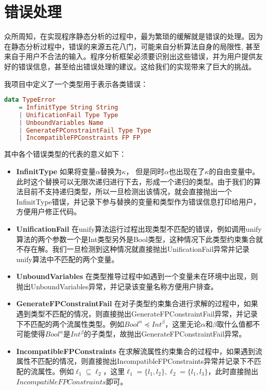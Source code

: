 \documentclass[UTF8, colorlinks]{pkuthss}
\begin{document}
	\section{错误处理}
	众所周知，在实现程序静态分析的过程中，最为繁琐的缓解就是错误的处理。因为在静态分析过程中，错误的来源五花八门，可能来自分析算法自身的局限性, 甚至来自于用户不合法的输入。程序分析框架必须要识别出这些错误，并为用户提供友好的错误信息，甚至给出错误处理的建议。这给我们的实现带来了巨大的挑战。
	
	我项目中定义了一个类型用于表示各类错误：
	\begin{lstlisting}[language=haskell]
data TypeError 
    = InfinitType String String
    | UnificationFail Type Type
    | UnboundVariables Name
    | GenerateFPConstraintFail Type Type
    | IncompatibleFPConstraints FP FP
	\end{lstlisting}
	其中各个错误类型的代表的意义如下：
	\begin{itemize}
		\item \textbf{InfinitType} 如果将变量$\alpha$替换为$\kappa$， 但是同时$\alpha$也出现在了$\kappa$的自由变量中。此时这个替换可以无限次递归进行下去，形成一个递归的类型。由于我们的算法目前不支持递归类型，所以一旦检测出该情况，就会直接抛出一个InfinitType错误，并记录下参与替换的变量和类型作为错误信息打印给用户，方便用户修正代码。
		\item \textbf{UnificationFail} 在unify算法运行过程出现类型不匹配的错误，例如调用unify算法的两个参数一个是Int类型另外是Bool类型，这种情况下此类型约束集合就不存在解。我们一旦检测到这种情况就直接抛出UnificationFail异常并记录unify算法中不匹配的两个变量。
		\item \textbf{UnboundVariables} 在类型推导过程中如遇到一个变量未在环境中出现，则抛出UnboundVariables异常，并记录该变量名称方便用户排查。
		\item \textbf{GenerateFPConstraintFail}  在对子类型约束集合进行求解的过程中，如果遇到类型不匹配的情况，则直接抛出GenerateFPConstraintFail异常，并记录下不匹配的两个流属性类型。例如$Bool^{\alpha}\preceq Int^{\beta}$，这里无论$\alpha$和$\beta$取什么值都不可能使得$Bool^{\alpha}$是$Int^{\beta}$的子类型，故抛出GenerateFPConstraintFail异常。
		\item \textbf{IncompatibleFPConstraints} 在求解流属性约束集合的过程中，如果遇到流属性不匹配的情况，则直接抛出IncompatibleFPConstraints异常并记录下不匹配的流属性。例如$\ell_1\subseteq\ell_2$，这里$\ell_1=\{l_1, l_2\}, \ell_2 = \{l_1, l_3\}$，此时直接抛出$IncompatibleFPConstraints$即可。
	\end{itemize}
	
\end{document}
